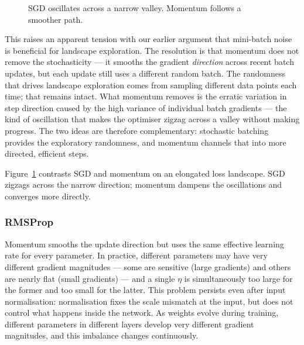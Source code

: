 \begin{figure}
\centering
{}
\resizebox{0.40\textwidth}{!}{}
\caption{SGD oscillates across a narrow valley. Momentum follows a smoother path.}
\label{fig:momentum}
\end{figure}
This raises an apparent tension with our earlier argument that mini-batch noise is beneficial for landscape exploration. The resolution is that momentum does not remove the stochasticity — it smooths the gradient \emph{direction} across recent batch updates, but each update still uses a different random batch. The randomness that drives landscape exploration comes from sampling different data points each time; that remains intact. What momentum removes is the erratic variation in step direction caused by the high variance of individual batch gradients — the kind of oscillation that makes the optimiser zigzag across a valley without making progress. The two ideas are therefore complementary: stochastic batching provides the exploratory randomness, and momentum channels that into more directed, efficient steps.

Figure~\ref{fig:momentum} contrasts SGD and momentum on an elongated loss landscape. SGD zigzags across the narrow direction; momentum dampens the oscillations and converges more directly.

\subsubsection{RMSProp}

Momentum smooths the update direction but uses the same effective learning rate for every parameter. In practice, different parameters may have very different gradient magnitudes — some are sensitive (large gradients) and others are nearly flat (small gradients) — and a single $\eta$ is simultaneously too large for the former and too small for the latter. This problem persists even after input normalisation: normalisation fixes the scale mismatch at the input, but does not control what happens inside the network. As weights evolve during training, different parameters in different layers develop very different gradient magnitudes, and this imbalance changes continuously.

